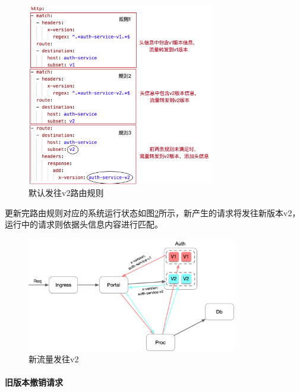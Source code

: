 \documentclass[a4paper]{article}
\theoremstyle{definition}
\begin{document}
\begin{figure}[!ht]
 \centering
 \includegraphics[height=8cm]{images/vs_default_v2.png}
 \caption{默认发往v2路由规则}
 \label{fig:vs_default_v2}
\end{figure}

更新完路由规则对应的系统运行状态如图\ref{fig:traffic_v1v2}所示，新产生的请求将发往新版本v2，运行中的请求则依据头信息内容进行匹配。
\begin{figure}[!ht]
 \centering
 \includegraphics[height=5cm]{images/traffic_v1v2.png}
 \caption{新流量发往v2}
 \label{fig:traffic_v1v2}
\end{figure}

\paragraph{旧版本撤销请求}\mbox{}\\
\end{document}
